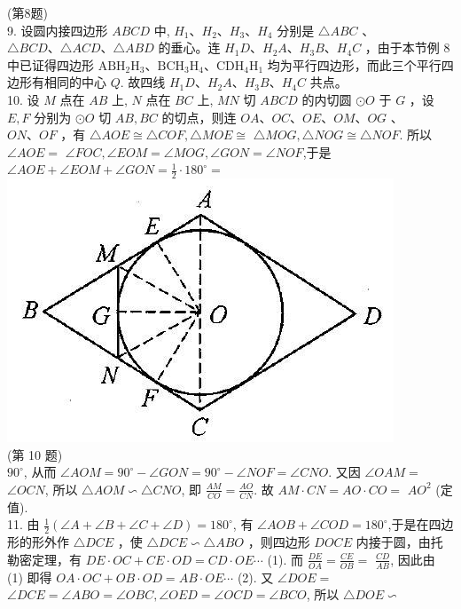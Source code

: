 \documentclass[10pt]{article}
\begin{document}
(第8题)\\
9. 设圆内接四边形 $A B C D$ 中, $H_{1} 、 H_{2} 、 H_{3} 、 H_{4}$ 分别是 $\triangle A B C$ 、 $\triangle B C D 、 \triangle A C D 、 \triangle A B D$ 的垂心。连 $H_{1} D 、 H_{2} A 、 H_{3} B 、 H_{4} C$ ，由于本节例 8中已证得四边形 $\mathrm{ABH}_{2} \mathrm{H}_{3} 、 \mathrm{BCH}_{3} \mathrm{H}_{4} 、 \mathrm{CDH}_{4} \mathrm{H}_{1}$ 均为平行四边形，而此三个平行四边形有相同的中心 $Q$. 故四线 $H_{1} D 、 H_{2} A 、 H_{3} B 、 H_{4} C$ 共点。\\
10. 设 $M$ 点在 $A B$ 上, $N$ 点在 $B C$ 上, $M N$ 切 $A B C D$ 的内切圆 $\odot O$ 于 $G$ ，设 $E, F$ 分别为 $\odot O$ 切 $A B, B C$ 的切点，则连 $O A 、 O C 、 O E 、 O M 、 O G$ 、 $O N 、 O F$ ，有 $\triangle A O E \cong \triangle C O F, \triangle M O E \cong$ $\triangle M O G, \triangle N O G \cong \triangle N O F$. 所以 $\angle A O E=$ $\angle F O C, \angle E O M=\angle M O G, \angle G O N=\angle N O F$,于是 $\angle A O E+\angle E O M+\angle G O N=\frac{1}{2} \cdot 180^{\circ}=$\\
\includegraphics[max width=\textwidth, center]{2024_10_30_2c8f45efd4a519b08e1ag-183}\\
(第 10 题)\\
$90^{\circ}$, 从而 $\angle A O M=90^{\circ}-\angle G O N=90^{\circ}-\angle N O F=\angle C N O$. 又因 $\angle O A M=$ $\angle O C N$, 所以 $\triangle A O M \backsim \triangle C N O$, 即 $\frac{A M}{C O}=\frac{A O}{C N}$. 故 $A M \cdot C N=A O \cdot C O=$ $A O^{2}$ (定值).\\
11. 由 $\frac{1}{2}(\angle A+\angle B+\angle C+\angle D)=180^{\circ}$, 有 $\angle A O B+\angle C O D=180^{\circ}$,于是在四边形的形外作 $\triangle D C E$ ，使 $\triangle D C E \backsim \triangle A B O$ ，则四边形 $D O C E$ 内接于圆，由托勒密定理，有 $D E \cdot O C+C E \cdot O D=C D \cdot O E \cdots$ (1). 而 $\frac{D E}{O A}=\frac{C E}{O B}=$ $\frac{C D}{A B}$, 因此由 (1) 即得 $O A \cdot O C+O B \cdot O D=A B \cdot O E \cdots$ (2). 又 $\angle D O E=$ $\angle D C E=\angle A B O=\angle O B C, \angle O E D=\angle O C D=\angle B C O$, 所以 $\triangle D O E \backsim$
\end{document}
